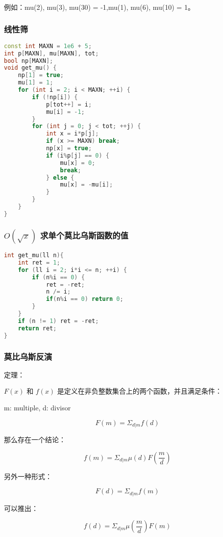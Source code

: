 例如：mu(2), mu(3), mu(30) = -1,mu(1), mu(6), mu(10) = 1。

\subsubsection{线性筛}

\begin{lstlisting}[language=C++]
const int MAXN = 1e6 + 5;
int p[MAXN], mu[MAXN], tot;
bool np[MAXN];
void get_mu() {
    np[1] = true;
    mu[1] = 1;
    for (int i = 2; i < MAXN; ++i) {
        if (!np[i]) {
            p[tot++] = i;
            mu[i] = -1;
        }
        for (int j = 0; j < tot; ++j) {
            int x = i*p[j];
            if (x >= MAXN) break;
            np[x] = true;
            if (i%p[j] == 0) {
                mu[x] = 0;
                break;
            } else {
                mu[x] = -mu[i];
            }
        }
    }
}
\end{lstlisting}

\subsubsection{$O(\sqrt{x})$ 求单个莫比乌斯函数的值}

\begin{lstlisting}[language=C++]
int get_mu(ll n){
    int ret = 1;
    for (ll i = 2; i*i <= n; ++i) {
        if (n%i == 0) {
            ret = -ret;
            n /= i;
            if(n%i == 0) return 0;
        }
    }
    if (n != 1) ret = -ret;
    return ret;
}
\end{lstlisting}

\subsubsection{莫比乌斯反演}

定理：

$F(x)$ 和 $f(x)$ 是定义在非负整数集合上的两个函数，并且满足条件：

m: multiple, d: divisor

$$F(m) = \Sigma_{d | m} f(d)$$

那么存在一个结论：

$$f(m) = \Sigma_{d | m} \mu (d) F(\frac{m}{d})$$

另外一种形式：

$$F(d) = \Sigma_{d | m} f(m)$$

可以推出：

$$f(d) = \Sigma_{d | m} \mu (\frac{m}{d}) F(m)$$

